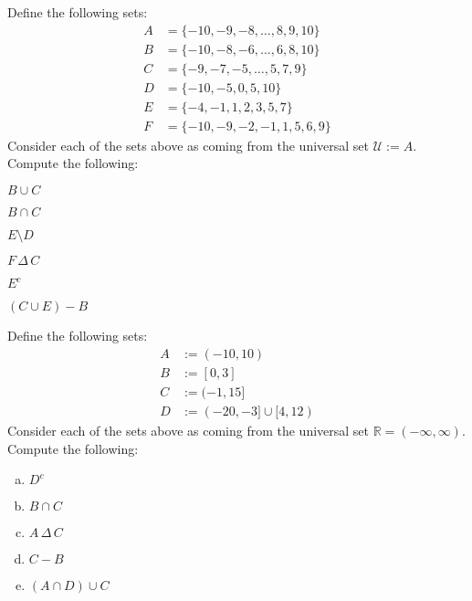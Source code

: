 \documentclass[11pt,letterpaper]{article}
\begin{document}
\newpage



 Define the following sets:
	\[
	\begin{aligned}
	A&= \{ -10, -9, -8, \ldots, 8, 9, 10 \} \\
	B&= \{ -10, -8, -6, \ldots, 6, 8, 10 \} \\
	C&= \{ -9, -7, -5, \ldots, 5, 7, 9 \} \\
	D&= \{ -10, -5, 0, 5, 10 \} \\
	E&= \{ -4, -1, 1, 2, 3, 5, 7 \} \\
	F&= \{ -10, -9, -2, -1, 1, 5, 6, 9 \}
	\end{aligned}
	\]
Consider each of the sets above as coming from the universal set $\mathcal{U}:= A$. Compute the following:
	\begin{2enumerate}
	\item $B \cup C$
	\item $B \cap C$
	\item $E \setminus D$
	\item $F \,\Delta\, C$
	\item $E^c$
	\item $(C \cup E) - B$
	\end{2enumerate}



\newpage



 Define the following sets:
	\[
	\begin{aligned}
	A&:= (-10, 10) \\
	B&:= [0, 3] \\
	C&:= (-1, 15] \\
	D&:= (-20, -3] \cup [4, 12)
	\end{aligned}
	\]
Consider each of the sets above as coming from the universal set $\mathbb{R}= (-\infty, \infty)$. Compute the following:
	\begin{enumerate}[(a)]
	\item $D^c$
	\item $B \cap C$
	\item $A \,\Delta\, C$
	\item $C - B$
	\item $(A \cap D) \cup C$
	\end{enumerate}
\end{document}
